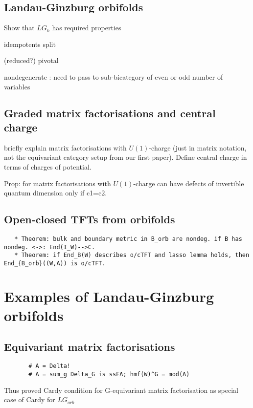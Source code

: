 \documentclass[12pt]{scrartcl}
\theoremstyle{definition}
\numberwithin{equation}{section}
\numberwithin{definition}{section}
\numberwithin{figure}{section}
\begin{document}
\subsection{Landau-Ginzburg orbifolds}

Show that $LG_k$ has required properties

idempotents split

(reduced?) pivotal

nondegenerate : need to pass to sub-bicategory of even or odd number of variables
       
\subsection{Graded matrix factorisations and central charge}

briefly explain matrix factorisations with $U(1)$-charge (just in matrix notation, not the equivariant category setup from our first paper). Define central charge in terms of charges of potential. 

Prop:
for matrix factorisations with $U(1)$-charge can have defects of invertible quantum dimension only if c1=c2.

\subsection{Open-closed TFTs from orbifolds}

\begin{verbatim}
   * Theorem: bulk and boundary metric in B_orb are nondeg. if B has nondeg. <->: End(I_W)-->C. 
   * Theorem: if End_B(W) describes o/cTFT and lasso lemma holds, then End_{B_orb}((W,A)) is o/cTFT.
\end{verbatim}


\section{Examples of Landau-Ginzburg orbifolds}

\subsection{Equivariant matrix factorisations}

\begin{verbatim}
       # A = Delta! 
       # A = sum_g Delta_G is ssFA; hmf(W)^G = mod(A)
\end{verbatim}

Thus proved Cardy condition for G-equivariant matrix factorisation as special case of Cardy for $LG_{orb}$
\end{document}
